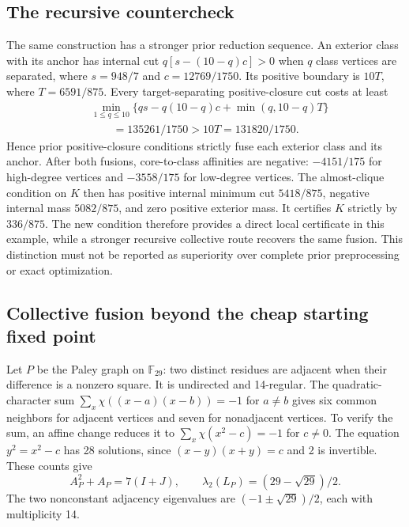 \documentclass[sigconf,anonymous,review]{acmart}
\newcommand{\1}{\mathbf{1}}
\begin{document}
\subsection{The recursive countercheck}
The same construction has a stronger prior reduction sequence.
An exterior class with its anchor has internal cut
$q[s-(10-q)c]>0$ when $q$ class vertices are separated, where
$s=948/7$ and $c=12769/1750$.
Its positive boundary is $10T$, where $T=6591/875$.
Every target-separating positive-closure cut costs at least
\begin{align*}
 &\min_{1\leq q\leq10}\{qs-q(10-q)c+\min(q,10-q)T\}\\
 &\qquad=135261/1750>10T=131820/1750.
\end{align*}
Hence prior positive-closure conditions strictly fuse each exterior class and
its anchor. After both fusions, core-to-class affinities are negative:
$-4151/175$ for high-degree vertices and $-3558/175$ for low-degree vertices.
The almost-clique condition on $K$ then has positive internal minimum cut
$5418/875$, negative internal mass $5082/875$, and zero positive exterior mass.
It certifies $K$ strictly by $336/875$.
The new condition therefore provides a direct local certificate in this
example, while a stronger recursive collective route recovers the same fusion.
This distinction must not be reported as superiority over complete prior
preprocessing or exact optimization.

\subsection{Collective fusion beyond the cheap starting fixed point}
\label{app:paley}
Let $P$ be the Paley graph on $\mathbb{F}_{29}$: two distinct residues are
adjacent when their difference is a nonzero square. It is undirected and
14-regular. The quadratic-character sum
$\sum_x\chi((x-a)(x-b))=-1$ for $a\ne b$ gives six common neighbors for
adjacent vertices and seven for nonadjacent vertices. To verify the sum,
an affine change reduces it to $\sum_x\chi(x^2-c)=-1$ for $c\ne0$.
The equation $y^2=x^2-c$ has 28 solutions, since
$(x-y)(x+y)=c$ and 2 is invertible. These counts give
\[
 A_P^2+A_P=7(I+J),\qquad
 \lambda_2(L_P)=(29-\sqrt{29})/2.
\]
The two nonconstant adjacency eigenvalues are
$(-1\pm\sqrt{29})/2$, each with multiplicity 14.
\end{document}

